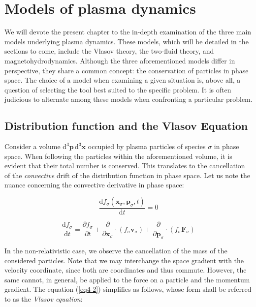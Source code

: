 \chapter{Models of plasma dynamics}

\label{plasma-models}

We will devote the present chapter to the in-depth examination of the three main models underlying plasma dynamics. These models, which will be detailed in the sections to come, include the Vlasov theory, the two-fluid theory, and magnetohydrodynamics. Although the three aforementioned models differ in perspective, they share a common concept: the conservation of particles in phase space. The choice of a model when examining a given situation is, above all, a question of selecting the tool best suited to the specific problem. It is often judicious to alternate among these models when confronting a particular problem.

\section{Distribution function and the Vlasov Equation}

Consider a volume $\mathrm{d}^3\mathbf{p}\,\mathrm{d}^3\mathbf{x}$ occupied by plasma particles of species $\sigma$ in phase space. When following the particles within the aforementioned volume, it is evident that their total number is conserved. This translates to the cancellation of the \textit{convective} drift of the distribution function in phase space. Let us note the nuance concerning the convective derivative in phase space:

\begin{equation}
    \label{eq4-1}
    \frac{\mathrm{d}f_\sigma(\mathbf{x}_\sigma,\mathbf{p}_\sigma,t)}{\mathrm{d}t}=0
\end{equation}

\begin{equation}
    \label{eq4-2}
    \frac{\mathrm{d}f_\sigma}{\mathrm{d}t}=\frac{\partial f_\sigma}{\partial t}+\frac{\partial}{\partial\mathbf{x}_\sigma}\cdot\left(f_\sigma\mathbf{v}_\sigma\right)+\frac{\partial}{\partial\mathbf{p}_\sigma}\cdot\left(f_\sigma\mathbf{F}_\sigma\right)
\end{equation}

In the non-relativistic case, we observe the cancellation of the mass of the considered particles. Note that we may interchange the space gradient with the velocity coordinate, since both are coordinates and thus commute. However, the same cannot, in general, be applied to the force on a particle and the momentum gradient. The equation (\ref{eq4-2}) simplifies as follows, whose form shall be referred to as the \textit{Vlasov equation}:


